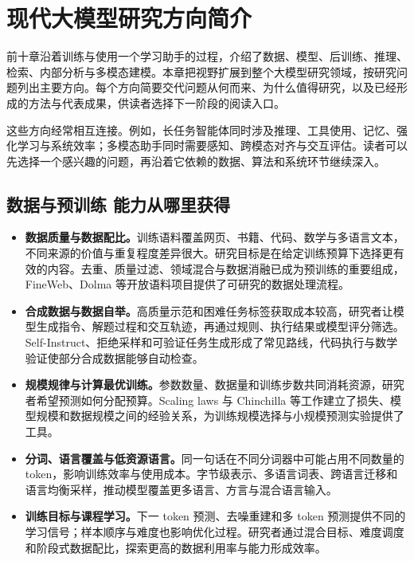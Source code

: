 \chapter{现代大模型研究方向简介}\label{现代大模型的研究方向简介}

前十章沿着训练与使用一个学习助手的过程，介绍了数据、模型、后训练、推理、检索、内部分析与多模态建模。本章把视野扩展到整个大模型研究领域，按研究问题列出主要方向。每个方向简要交代问题从何而来、为什么值得研究，以及已经形成的方法与代表成果，供读者选择下一阶段的阅读入口。

这些方向经常相互连接。例如，长任务智能体同时涉及推理、工具使用、记忆、强化学习与系统效率；多模态助手同时需要感知、跨模态对齐与交互评估。读者可以先选择一个感兴趣的问题，再沿着它依赖的数据、算法和系统环节继续深入。

\section{数据与预训练 能力从哪里获得}

\begin{itemize}
    \item \textbf{数据质量与数据配比。}训练语料覆盖网页、书籍、代码、数学与多语言文本，不同来源的价值与重复程度差异很大。研究目标是在给定训练预算下选择更有效的内容。去重、质量过滤、领域混合与数据消融已成为预训练的重要组成，FineWeb、Dolma 等开放语料项目提供了可研究的数据处理流程。
    \item \textbf{合成数据与数据自举。}高质量示范和困难任务标签获取成本较高，研究者让模型生成指令、解题过程和交互轨迹，再通过规则、执行结果或模型评分筛选。Self-Instruct、拒绝采样和可验证任务生成形成了常见路线，代码执行与数学验证使部分合成数据能够自动检查。
    \item \textbf{规模规律与计算最优训练。}参数数量、数据量和训练步数共同消耗资源，研究者希望预测如何分配预算。Scaling laws 与 Chinchilla 等工作建立了损失、模型规模和数据规模之间的经验关系，为训练规模选择与小规模预测实验提供了工具。
    \item \textbf{分词、语言覆盖与低资源语言。}同一句话在不同分词器中可能占用不同数量的 token，影响训练效率与使用成本。字节级表示、多语言词表、跨语言迁移和语言均衡采样，推动模型覆盖更多语言、方言与混合语言输入。
    \item \textbf{训练目标与课程学习。}下一 token 预测、去噪重建和多 token 预测提供不同的学习信号；样本顺序与难度也影响优化过程。研究者通过混合目标、难度调度和阶段式数据配比，探索更高的数据利用率与能力形成效率。
\end{itemize}

